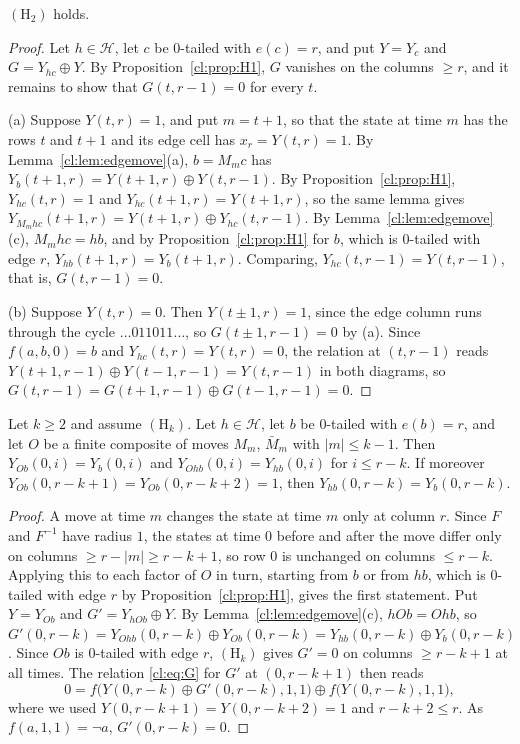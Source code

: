 \begin{proposition}[$(\mathrm H_2)$]\label{cl:prop:H2}
$(\mathrm H_2)$ holds.
\end{proposition}

\begin{proof}
Let $h\in\mathcal H$, let $c$ be $0$-tailed with $e(c)=r$, and put $Y=Y_c$ and $G=Y_{hc}\oplus Y$. By Proposition~\ref{cl:prop:H1}, $G$ vanishes on the columns $\ge r$, and it remains to show that $G(t,r-1)=0$ for every $t$.

(a) Suppose $Y(t,r)=1$, and put $m=t+1$, so that the state at time $m$ has the rows $t$ and $t+1$ and its edge cell has $x_r=Y(t,r)=1$. By Lemma~\ref{cl:lem:edgemove}(a), $b=M_mc$ has $Y_b(t+1,r)=Y(t+1,r)\oplus Y(t,r-1)$. By Proposition~\ref{cl:prop:H1}, $Y_{hc}(t,r)=1$ and $Y_{hc}(t+1,r)=Y(t+1,r)$, so the same lemma gives $Y_{M_mhc}(t+1,r)=Y(t+1,r)\oplus Y_{hc}(t,r-1)$. By Lemma~\ref{cl:lem:edgemove}(c), $M_mhc=hb$, and by Proposition~\ref{cl:prop:H1} for $b$, which is $0$-tailed with edge $r$, $Y_{hb}(t+1,r)=Y_b(t+1,r)$. Comparing, $Y_{hc}(t,r-1)=Y(t,r-1)$, that is, $G(t,r-1)=0$.

(b) Suppose $Y(t,r)=0$. Then $Y(t\pm1,r)=1$, since the edge column runs through the cycle $\dots011011\dots$, so $G(t\pm1,r-1)=0$ by (a). Since $f(a,b,0)=b$ and $Y_{hc}(t,r)=Y(t,r)=0$, the relation at $(t,r-1)$ reads $Y(t+1,r-1)\oplus Y(t-1,r-1)=Y(t,r-1)$ in both diagrams, so $G(t,r-1)=G(t+1,r-1)\oplus G(t-1,r-1)=0$.
\end{proof}

\begin{lemma}\label{cl:lem:clean}
Let $k\ge2$ and assume $(\mathrm H_k)$. Let $h\in\mathcal H$, let $b$ be $0$-tailed with $e(b)=r$, and let $O$ be a finite composite of moves $M_m$, $\bar M_m$ with $|m|\le k-1$. Then $Y_{Ob}(0,i)=Y_b(0,i)$ and $Y_{Ohb}(0,i)=Y_{hb}(0,i)$ for $i\le r-k$. If moreover $Y_{Ob}(0,r-k+1)=Y_{Ob}(0,r-k+2)=1$, then $Y_{hb}(0,r-k)=Y_b(0,r-k)$.
\end{lemma}

\begin{proof}
A move at time $m$ changes the state at time $m$ only at column $r$. Since $F$ and $F^{-1}$ have radius $1$, the states at time $0$ before and after the move differ only on columns $\ge r-|m|\ge r-k+1$, so row $0$ is unchanged on columns $\le r-k$. Applying this to each factor of $O$ in turn, starting from $b$ or from $hb$, which is $0$-tailed with edge $r$ by Proposition~\ref{cl:prop:H1}, gives the first statement. Put $Y=Y_{Ob}$ and $G'=Y_{hOb}\oplus Y$. By Lemma~\ref{cl:lem:edgemove}(c), $hOb=Ohb$, so $G'(0,r-k)=Y_{Ohb}(0,r-k)\oplus Y_{Ob}(0,r-k)=Y_{hb}(0,r-k)\oplus Y_b(0,r-k)$. Since $Ob$ is $0$-tailed with edge $r$, $(\mathrm H_k)$ gives $G'=0$ on columns $\ge r-k+1$ at all times. The relation \eqref{cl:eq:G} for $G'$ at $(0,r-k+1)$ then reads
\[
0=f\bigl(Y(0,r-k)\oplus G'(0,r-k),1,1\bigr)\oplus f\bigl(Y(0,r-k),1,1\bigr),
\]
where we used $Y(0,r-k+1)=Y(0,r-k+2)=1$ and $r-k+2\le r$. As $f(a,1,1)=\neg a$, $G'(0,r-k)=0$.
\end{proof}

